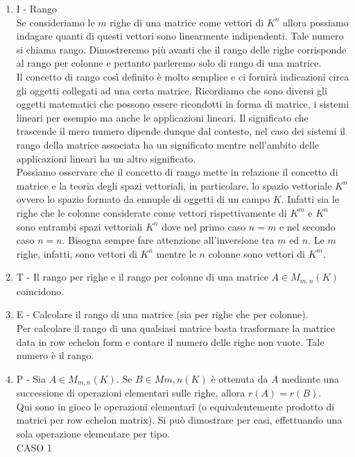 \documentclass[]{article}
\begin{document}
\begin{enumerate}
	\item I - Rango	\\
	          Se consideriamo le $m$ righe di una matrice come vettori di $K^n$ allora possiamo indagare quanti di questi vettori sono linearmente indipendenti. Tale numero si chiama rango. Dimostreremo pi\`u avanti che il rango delle righe corrisponde al rango per colonne e pertanto parleremo solo di rango di una matrice. \\
	          Il concetto di rango cos\`i definito \`e molto semplice e ci fornir\`a indicazioni circa gli oggetti collegati ad una certa matrice. Ricordiamo che sono diversi gli oggetti matematici che possono essere ricondotti in forma di matrice, i sistemi lineari per esempio ma anche le applicazioni lineari. Il significato che trascende il mero numero dipende dunque dal contesto, nel caso dei sistemi il rango della matrice associata ha un significato mentre nell'ambito delle applicazioni lineari ha un altro significato. \\
	          Possiamo osservare che il concetto di rango mette in relazione il concetto di matrice e la teoria degli spazi vettoriali, in particolare, lo spazio vettoriale $K^n$ ovvero lo spazio formato da ennuple di oggetti di un campo $K$. Infatti sia le righe che le colonne considerate come vettori rispettivamente di $K^m$ e $K^n$ sono entrambi spazi vettoriali $K^n$ dove nel primo caso $n=m$ e nel secondo caso $n=n$. Bisogna sempre fare attenzione all'inversione tra $m$ ed $n$. Le $m$ righe, infatti, sono vettori di $K^n$ mentre le $n$ colonne sono vettori di $K^m$.  
	\item T - Il rango per righe e il rango per colonne di una matrice $A \in M_{m,n}(K)$ coincidono.	
	\item E - Calcolare il rango di una matrice (sia per righe che per colonne). \\
			  Per calcolare il rango di una qualsiasi matrice basta trasformare la matrice data in row echelon form e contare il numero delle righe non vuote. Tale numero \`e il rango.
	\item P - Sia $A \in M_{m,n}(K)$. Se $B \in M{m,n}(K)$ \`e ottenuta da $A$ mediante una successione di operazioni elementari sulle righe, allora $r(A) = r(B)$. \\
			  Qui sono in gioco le operazioni elementari (o equivalentemente prodotto di matrici per row echelon matrix). Si pu\`o dimostrare per casi, effettuando una sola operazione elementare per tipo. \\
			  CASO 1 \\

\end{enumerate}
\end{document}
